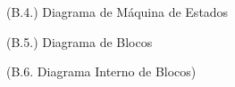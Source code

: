 \documentclass[12pt,a4paper]{article}
\begin{document}
\begin{landscape}
  \begin{figure}
    \centering
    
    \caption{(B.4.) Diagrama de Máquina de Estados}
    \label{fig:state-machine}
  \end{figure}
\end{landscape}

\begin{landscape}
  \begin{figure}
    \centering
    
    \caption{(B.5.) Diagrama de Blocos}
    \label{fig:bbd}
  \end{figure}
\end{landscape}

\begin{landscape}
  \begin{figure}
    \centering
    
    \caption{(B.6. Diagrama Interno de Blocos)}
    \label{fig:ibd}
  \end{figure}
\end{landscape}
\end{document}

